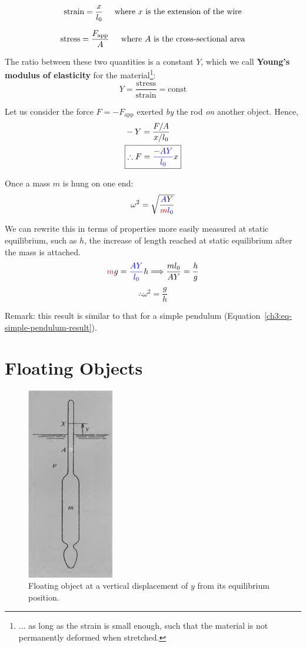 \documentclass[11pt,letterpaper,titlepage,oneside]{book}
\newcommand{\htab}{\hspace{0.5cm}}
\newcommand{\where}{\htab\text{where }}
\newcommand{\kcol}[1]{\textcolor{blue}{#1}}
\newcommand{\mcol}[1]{\textcolor{red}{#1}}
\begin{document}
\[  \text{strain} = \frac{x}{l_0} \where\text{$x$ is the extension of the wire}  \]

\[ \text{stress} = \frac{F_\text{app}}{A} \where\text{$A$ is the cross-sectional area} \]

The ratio between these two quantities is a constant $Y$, which we call \textbf{Young's modulus of elasticity} for the material\footnote{... as long as the strain is small enough, such that the material is not permanently deformed when stretched.}:
\[\boxed{ Y = \frac{\text{stress}}{\text{strain}} = \text{const} } \]

Let us consider the force $F = -F_\text{app}$ exerted \emph{by} the rod \emph{on} another object. Hence,
\begin{align*}
	& -Y = \frac{F/A}{x/l_0} \\
	& \boxed{\therefore F = \kcol{\frac{-AY}{l_0}} x \label{ch3:eq-youngs-F}}
\end{align*}


Once a mass $m$ is hung on one end:
\[ \omega^2 = \sqrt{\frac{\kcol AY}{\mcol m \kcol{l_0}}} \]

We can rewrite this in terms of properties more easily measured at static equilibrium, such as $h$, the increase of length reached at static equilibrium after the mass is attached.
\[ \mcol{m}g=\kcol{\frac{AY}{l_0}} h \Longrightarrow \frac{ml_0}{AY}=\frac{h}{g} \]
\begin{equation}
\therefore \omega^2 = \frac{g}{h}  \label{ch3:eq-elastic-wire-result}
\end{equation} 

Remark: this result is similar to that for a simple pendulum (Equation~\ref{ch3:eq-simple-pendulum-result}).

\section{Floating Objects} \label{ch3:sec-floating}

\begin{figure}[h]
	\centering
	\includegraphics[scale=0.6]{phys232/Ch3-floating.png} \caption{Floating object at a vertical displacement of $y$ from its equilibrium position.}\label{ch3:fig-floating}
\end{figure}
\end{document}
